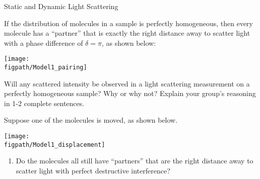 \begin{activity}{Static and Dynamic Light Scattering}
%		
%	
%		
%	
%	
%	



\begin{model}
	
	If the distribution of molecules in a sample is perfectly homogeneous, then every molecule has a ``partner'' that is exactly the right distance away to scatter light with a phase difference of $\delta = \pi$, as shown below:
	
	\centerline{\texttt{[image: \\figpath/Model1\_pairing]}}
	
\end{model}


\begin{ctqs}
	
	\question Will any scattered intensity be observed in a light scattering measurement on a perfectly homogeneous sample?  Why or why not?  Explain your group's reasoning in 1-2 complete sentences.
	
		\begin{solution}[1.5in]
		\end{solution}

	\question Suppose one of the molecules is moved, as shown below.
	
	\vspace{6pt}
	\centerline{\texttt{[image: \\figpath/Model1\_displacement]}}

		\begin{enumerate}
			\item Do the molecules all still have ``partners'' that are the right distance away to scatter light with perfect destructive interference? 
	
		\begin{solution}[0.5in]
		\end{solution}
			

\end{enumerate}
\end{ctqs}
\end{activity}

